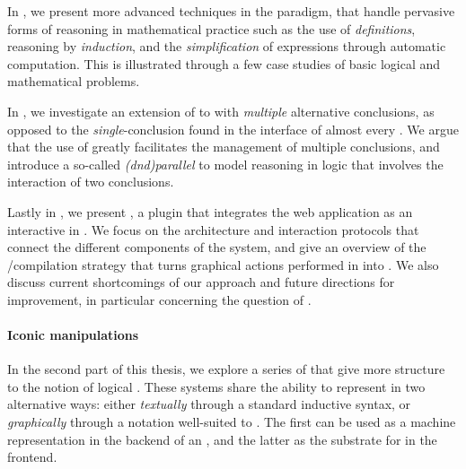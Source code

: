 In , we present more advanced techniques in the 
paradigm, that handle pervasive forms of reasoning in mathematical practice such
as the use of \emph{definitions}, reasoning by \emph{induction}, and the
\emph{simplification} of expressions through automatic computation. This is
illustrated through a few case studies of basic logical and mathematical
problems.

In , we investigate an extension of  to 
with \emph{multiple} alternative conclusions, as opposed to the
\emph{single}-conclusion  found in the interface of almost every
. We argue that the use of  greatly facilitates
the management of multiple conclusions, and introduce a so-called
\emph{\kl(dnd){parallel}}  to model reasoning in 
logic that involves the interaction of two conclusions.

\AP
Lastly in , we present , a plugin that
integrates the  web application as an interactive  in
. We focus on the architecture and interaction protocols that connect
the different components of the system, and give an overview of the
/compilation strategy that turns graphical actions performed in
 into  . We also discuss current shortcomings
of our approach and future directions for improvement, in particular concerning
the question of .

\paragraph{Iconic manipulations}
  
In the second part of this thesis, we explore a series of 
 that give more structure to the notion of logical
\emph{}. These systems share the ability to represent  in two
alternative ways: either \emph{textually} through a standard inductive syntax,
or \emph{graphically} through a  notation well-suited to
. The first can be used as a machine representation in
the backend of an , and the latter as the substrate for  in the
frontend.

